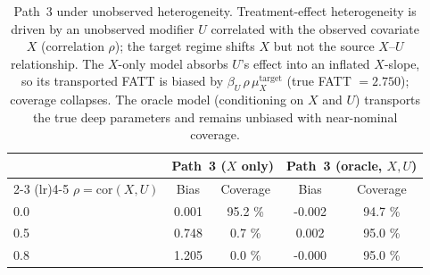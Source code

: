\begin{table}[htbp]
\centering
\caption{Path~3 under unobserved heterogeneity. Treatment-effect heterogeneity is driven by
an unobserved modifier \(U\) correlated with the observed covariate \(X\) (correlation
\(\rho\)); the target regime shifts \(X\) but not the source \(X\)--\(U\) relationship.
The \(X\)-only model absorbs \(U\)'s effect into an inflated \(X\)-slope, so its transported
FATT is biased by \(\beta_U\,\rho\,\mu_X^{\text{target}}\) (true FATT \(=2.750\)); coverage
collapses. The oracle model (conditioning on \(X\) and \(U\)) transports the true deep
parameters and remains unbiased with near-nominal coverage.}
\label{tab:section8_2}
\begin{tabular}{lcccc}
\toprule
& \multicolumn{2}{c}{Path~3 (\(X\) only)} & \multicolumn{2}{c}{Path~3 (oracle, \(X, U\))} \\
\cmidrule(lr){2-3} \cmidrule(lr){4-5}
\(\rho = \mathrm{cor}(X, U)\) & Bias & Coverage & Bias & Coverage \\
\midrule
0.0 &
0.001
 &
95.2
\% &
-0.002
 &
94.7
\% \\
0.5 &
0.748
 &
0.7
\% &
0.002
 &
95.0
\% \\
0.8 &
1.205
 &
0.0
\% &
-0.000
 &
95.0
\% \\
\bottomrule
\end{tabular}
\end{table}


